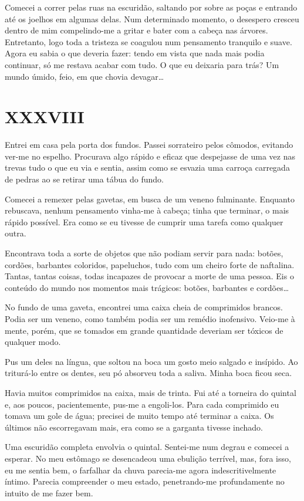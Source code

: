 Comecei a correr pelas ruas na escuridão, saltando por sobre as poças e entrando até os joelhos em algumas delas.
Num determinado momento, o desespero cresceu dentro de mim compelindo-me a gritar e bater com a cabeça nas árvores. Entretanto, logo toda a tristeza se coagulou num pensamento tranquilo e suave. Agora eu sabia o que deveria fazer: tendo em vista que nada mais podia continuar, só me restava acabar com tudo. O que eu deixaria para trás? Um mundo úmido, feio, em que chovia devagar\dots


\chapter*{\centering\Large{XXXVIII}}

Entrei em casa pela porta dos fundos. Passei sorrateiro pelos cômodos, evitando ver-me no espelho. Procurava algo rápido e eficaz que despejasse de uma vez nas trevas tudo o que eu via e sentia, assim como se esvazia uma carroça carregada de pedras ao se retirar uma tábua do fundo.

Comecei a remexer pelas gavetas, em busca de um veneno fulminante. Enquanto rebuscava, nenhum pensamento vinha-me à cabeça; tinha que terminar, o mais rápido possível. Era como se eu tivesse de cumprir uma tarefa como qualquer outra. 

Encontrava toda a sorte de objetos que não podiam servir para nada: botões, cordões, barbantes coloridos, papeluchos, tudo com um cheiro forte de naftalina. Tantas, tantas coisas, todas incapazes de provocar a morte de uma pessoa. Eis o conteúdo do mundo nos momentos mais trágicos: botões, barbantes e cordões\dots

No fundo de uma gaveta, encontrei uma caixa cheia de comprimidos brancos. Podia ser um veneno, como também podia ser um remédio inofensivo. Veio-me à mente, porém, que se tomados em grande quantidade deveriam ser tóxicos de qualquer modo.

Pus um deles na língua, que soltou na boca um gosto meio salgado e insípido. Ao triturá-lo entre os dentes, seu pó absorveu toda a saliva. Minha boca ficou seca.

Havia muitos comprimidos na caixa, mais de trinta. Fui até a torneira do quintal e, aos poucos, pacientemente, pus-me a engoli-los.
Para cada comprimido eu tomava um gole de água; precisei de muito tempo até terminar a caixa. Os últimos não escorregavam mais, era como se a garganta tivesse inchado.

Uma escuridão completa envolvia o quintal. Sentei-me num degrau e comecei a esperar. No meu estômago se desencadeou uma ebulição terrível, mas, fora isso, eu me sentia bem, o farfalhar da chuva parecia-me agora indescritivelmente íntimo. Parecia compreender o meu estado, penetrando-me profundamente no intuito de me fazer bem.

